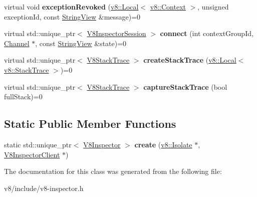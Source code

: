 \begin{DoxyCompactItemize}
virtual void {\bfseries exception\+Revoked} (\mbox{\hyperlink{classv8_1_1Local}{v8\+::\+Local}}$<$ \mbox{\hyperlink{classv8_1_1Context}{v8\+::\+Context}} $>$, unsigned exception\+Id, const \mbox{\hyperlink{classv8__inspector_1_1StringView}{String\+View}} \&message)=0
\item 
\mbox{\label{classv8__inspector_1_1V8Inspector_ada36fa35ede4b3fda70b07fc855458e4}} 
virtual std\+::unique\+\_\+ptr$<$ \mbox{\hyperlink{classv8__inspector_1_1V8InspectorSession}{V8\+Inspector\+Session}} $>$ {\bfseries connect} (int context\+Group\+Id, \mbox{\hyperlink{classv8__inspector_1_1V8Inspector_1_1Channel}{Channel}} $\ast$, const \mbox{\hyperlink{classv8__inspector_1_1StringView}{String\+View}} \&state)=0
\item 
\mbox{\label{classv8__inspector_1_1V8Inspector_a4ac935e4871eef8ee5cb2e5ca41a2142}} 
virtual std\+::unique\+\_\+ptr$<$ \mbox{\hyperlink{classv8__inspector_1_1V8StackTrace}{V8\+Stack\+Trace}} $>$ {\bfseries create\+Stack\+Trace} (\mbox{\hyperlink{classv8_1_1Local}{v8\+::\+Local}}$<$ \mbox{\hyperlink{classv8_1_1StackTrace}{v8\+::\+Stack\+Trace}} $>$)=0
\item 
\mbox{\label{classv8__inspector_1_1V8Inspector_a22af900e1627ca8ef9382c0507645d70}} 
virtual std\+::unique\+\_\+ptr$<$ \mbox{\hyperlink{classv8__inspector_1_1V8StackTrace}{V8\+Stack\+Trace}} $>$ {\bfseries capture\+Stack\+Trace} (bool full\+Stack)=0
\end{DoxyCompactItemize}
\subsection*{Static Public Member Functions}
\begin{DoxyCompactItemize}
\item 
\mbox{\label{classv8__inspector_1_1V8Inspector_ac7b64842334aadde7dabff1ac6d82cff}} 
static std\+::unique\+\_\+ptr$<$ \mbox{\hyperlink{classv8__inspector_1_1V8Inspector}{V8\+Inspector}} $>$ {\bfseries create} (\mbox{\hyperlink{classv8_1_1Isolate}{v8\+::\+Isolate}} $\ast$, \mbox{\hyperlink{classv8__inspector_1_1V8InspectorClient}{V8\+Inspector\+Client}} $\ast$)
\end{DoxyCompactItemize}


The documentation for this class was generated from the following file\+:\begin{DoxyCompactItemize}
\item 
v8/include/v8-\/inspector.\+h\end{DoxyCompactItemize}
